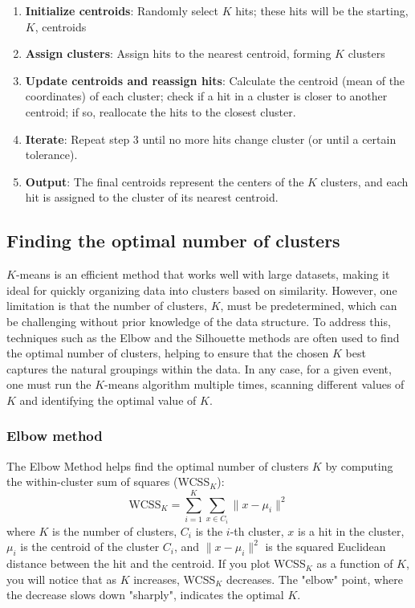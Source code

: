 \documentclass[a4paper,12pt]{article}
\begin{document}
\begin{enumerate}
    \item \textbf{Initialize centroids}: Randomly select $K$ hits; these hits will be the starting, $K$, centroids
    \item \textbf{Assign clusters}: Assign hits to the nearest centroid, forming $K$ clusters
    \item \textbf{Update centroids and reassign hits}: Calculate the centroid (mean of the coordinates) of each cluster; check if a hit in a cluster is closer to another centroid; if so, reallocate the hits to the closest cluster.
    \item \textbf{Iterate}: Repeat step 3 until no more hits change cluster (or until a certain tolerance).
    \item \textbf{Output}: The final centroids represent the centers of the $K$ clusters, and each hit is assigned to the cluster of its nearest centroid.
\end{enumerate}

\subsection{Finding the optimal number of clusters}

$K$-means is an efficient method that works well with large datasets, making it ideal for quickly organizing data into clusters based on similarity.
However, one limitation is that the number of clusters, $K$, must be predetermined, which can be challenging without prior knowledge of the data structure.
To address this, techniques such as the Elbow and the Silhouette methods are often used to find the optimal number of clusters, helping to ensure that the chosen $K$ best captures the natural groupings within the data.
In any case, for a given event, one must run the $K$-means algorithm multiple times, scanning different values of $K$ and identifying the optimal value of $K$.

\subsubsection{Elbow method}

The Elbow Method helps find the optimal number of clusters \( K \) by computing the within-cluster sum of squares (WCSS$_K$):
\[
    \text{WCSS}_K = \sum_{i=1}^{K} \sum_{x \in C_i} \| x - \mu_i \|^2
\]
where $K$ is the number of clusters, $C_i$ is the $i$-th cluster, $x$ is a hit in the cluster, $\mu_i$ is the centroid of the cluster $C_i$, and $\| x - \mu_i \|^2$ is the squared Euclidean distance between the hit and the centroid.
If you plot WCSS$_K$ as a function of $K$, you will notice that as \( K \) increases, WCSS$_K$ decreases.
The "elbow" point, where the decrease slows down "sharply", indicates the optimal \( K \).
\end{document}
